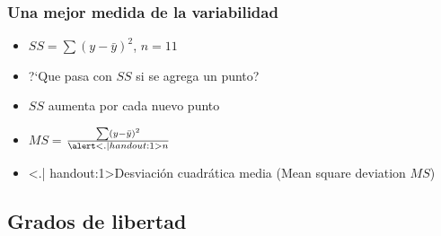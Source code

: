 \documentclass[gray,handout,mathserif]{beamer}
\begin{document}
\begin{frame}[label=var2]
   \frametitle{Una mejor medida de la variabilidad}
    \begin{itemize}[<+-| visible@+-| handout:1>]
      \item $SS=\sum(y-\bar{y})^2$, $n=11$ 
      \item ?`Que pasa con $SS$ si se agrega un punto?
      \item $SS$ aumenta por cada nuevo punto
      \smallskip
      \item $MS=$\LARGE{$\frac{\sum(y-\bar{y})^2}{\alert<.| handout:1>{n}}$}
      \smallskip
      \item \alert<.| handout:1>{Desviaci\'on cuadr\'atica media} (Mean square deviation $MS$)
   \end{itemize}
\end{frame}%


\subsection[Grados de libertad]{Grados de libertad}
\end{document}
